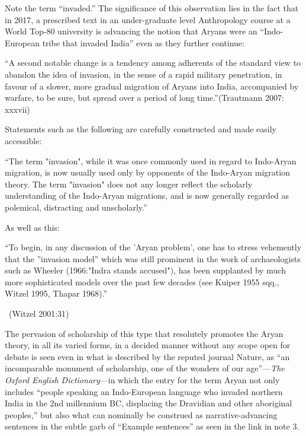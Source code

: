 Note the term “invaded.” The significance of this observation lies in the fact that in 2017, a prescribed text in an under-graduate level Anthropology course at a World Top-80 university is advancing the notion that Aryans were an “Indo-European tribe that invaded India” even as they further continue:

\begin{myquote}
“A second notable change is a tendency among adherents of the standard view to abandon the idea of invasion, in the sense of a rapid military penetration, in favour of a slower, more gradual migration of Aryans into India, accompanied by warfare, to be sure, but spread over a period of long time.”\hfill (Trautmann 2007: xxxvii)
\end{myquote}

Statements such as the following are carefully constructed and made easily accessible:

\begin{myquote}
“The term "invasion", while it was once commonly used in regard to Indo-Aryan migration, is now usually used only by opponents of the Indo-Aryan migration theory. The term "invasion" does not any longer reflect the scholarly understanding of the Indo-Aryan migrations, and is now generally regarded as polemical, distracting and unscholarly.”
\end{myquote}

As well as this:

\begin{myquote}
“To begin, in any discussion of the 'Aryan problem', one has to stress vehemently that the ''invasion model'' which was still prominent in the work of archaeologists such as Wheeler (1966:"Indra stands accused"), has been supplanted by much more sophisticated models over the past few decades (see Kuiper 1955 sqq., Witzel 1995, Thapar 1968).”

~\hfill (Witzel 2001:31)
\end{myquote}

The pervasion of scholarship of this type that resolutely promotes the Aryan theory, in all its varied forms, in a decided manner without any scope open for debate is seen even in what is described by the reputed journal Nature, as “an incomparable monument of scholarship, one of the wonders of our age”—\textit{The Oxford English Dictionary}—in which the entry for the term Aryan not only includes “people speaking an Indo-European language who invaded northern India in the 2nd millennium BC, displacing the Dravidian and other aboriginal peoples,” but also what can nominally be construed as narrative-advancing sentences in the subtle garb of “Example sentences” as seen in the link in note 3.

